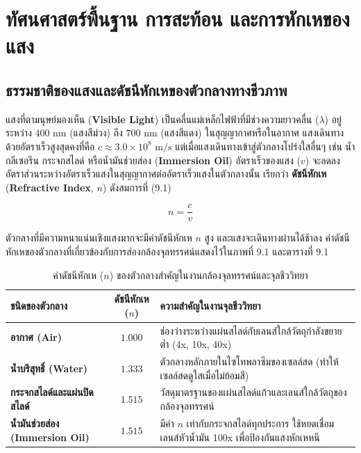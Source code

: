 \chapter{ทัศนศาสตร์พื้นฐาน การสะท้อน และการหักเหของแสง}

\section{ธรรมชาติของแสงและดัชนีหักเหของตัวกลางทางชีวภาพ}


แสงที่ตามนุษย์มองเห็น (\textbf{Visible Light}) เป็นคลื่นแม่เหล็กไฟฟ้าที่มีช่วงความยาวคลื่น ($\lambda$) อยู่ระหว่าง $400\text{ nm}$ (แสงสีม่วง) ถึง $700\text{ nm}$ (แสงสีแดง) ในสุญญากาศหรือในอากาศ แสงเดินทางด้วยอัตราเร็วสูงสุดคงที่คือ $c \approx 3.0 \times 10^8\text{ m/s}$ แต่เมื่อแสงเดินทางเข้าสู่ตัวกลางโปร่งใสอื่นๆ เช่น น้ำ กลีเซอรีน กระจกสไลด์ หรือน้ำมันช่วยส่อง (\textbf{Immersion Oil}) อัตราเร็วของแสง ($v$) จะลดลง อัตราส่วนระหว่างอัตราเร็วแสงในสุญญากาศต่ออัตราเร็วแสงในตัวกลางนั้น เรียกว่า \textbf{ดัชนีหักเห} (\textbf{Refractive Index}, $n$) ดังสมการที่ (9.1)

\begin{equation}
    n = \frac{c}{v}
\end{equation}

ตัวกลางที่มีความหนาแน่นเชิงแสงมากจะมีค่าดัชนีหักเห $n$ สูง และแสงจะเดินทางผ่านได้ช้าลง ค่าดัชนีหักเหของตัวกลางที่เกี่ยวข้องกับการส่องกล้องจุลทรรศน์แสดงไว้ใน\mbox{ภาพที่} 9.1 และ\mbox{ตารางที่} 9.1

\begin{table}[H]
\centering
\caption{ค่าดัชนีหักเห ($n$) ของตัวกลางสำคัญในงานกล้องจุลทรรศน์และจุลชีววิทยา}
\small
\begin{tabularx}{\textwidth}{>{\bfseries}p{4.5cm} c >{\raggedright\arraybackslash}X}
\toprule
ชนิดของตัวกลาง & ดัชนีหักเห ($n$) & ความสำคัญในงานจุลชีววิทยา \\
\midrule
อากาศ (Air) & $1.000$ & ช่องว่างระหว่างแผ่นสไลด์กับเลนส์ใกล้วัตถุกำลังขยายต่ำ (4x, 10x, 40x) \\
น้ำบริสุทธิ์ (Water) & $1.333$ & ตัวกลางหลักภายในไซโทพลาซึมของเซลล์สด (ทำให้เซลล์สดดูใสเมื่อไม่ย้อมสี) \\
กระจกสไลด์และแผ่นปิดสไลด์ & $1.515$ & วัสดุมาตรฐานของแผ่นสไลด์แก้วและเลนส์ใกล้วัตถุของกล้องจุลทรรศน์ \\
น้ำมันช่วยส่อง (Immersion Oil) & $1.515$ & มีค่า $n$ เท่ากับกระจกสไลด์ทุกประการ ใช้หยดเชื่อมเลนส์หัวน้ำมัน 100x เพื่อป้องกันแสงหักเหหนี \\
\bottomrule
\end{tabularx}
\end{table}

